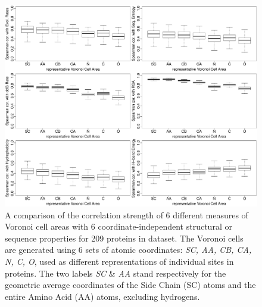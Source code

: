 \documentclass[11pt]{article}
\begin{document}
    \begin{figure}
        \begin{center}
        \includegraphics[width=5.5in]{best_varea/select_variables/boxplot_varea_all_in_one.pdf}
        \end{center}
        \caption{A comparison of the correlation strength of 6 different measures of Voronoi cell areas with 6 coordinate-independent structural or sequence properties for 209 proteins in dataset.  The Voronoi cells are generated using 6 sets of atomic coordinates: {\it SC, AA, CB, CA, N, C, O}, used as different representations of individual sites in proteins. The two labels {\it SC} \& {\it AA} stand respectively for the geometric average coordinates of the Side Chain (SC) atoms and the entire Amino Acid (AA) atoms, excluding hydrogens.}
        \label{fig:best_voronoi}
    \end{figure}
\end{document}
